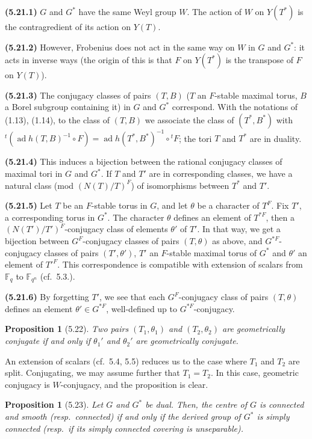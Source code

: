 \documentclass[11pt]{amsart}
\theoremstyle{plain}
\newtheorem{proposition}[theorem]{Proposition}
\theoremstyle{remark}
\DeclareMathOperator{\ad}{ad}
\begin{document}
\textbf{(5.21.1)} $G$ and $G^*$ have the same Weyl group $W$. The action of $W$ on $Y(T^*)$ is the contragredient of its action on $Y(T)$.

\textbf{(5.21.2)} However, Frobenius does not act in the same way on $W$ in $G$ and $G^*$: it acts in inverse ways (the origin of this is that $F$ on $Y(T^*)$ is the transpose of $F$ on $Y(T)$).

\textbf{(5.21.3)} The conjugacy classes of pairs $(T, B)$ ($T$ an $F$-stable maximal torus, $B$ a Borel subgroup containing it) in $G$ and $G^*$ correspond. With the notations of (1.13), (1.14), to the class of $(T, B)$ we associate the class of $(T^*, B^*)$ with ${}^t(\ad h(T, B)^{-1} \circ F) = \ad h(T^*, B^*)^{-1} \circ {}^tF$; the tori $T$ and $T^*$ are in duality.

\textbf{(5.21.4)} This induces a bijection between the rational conjugacy classes of maximal tori in $G$ and $G^*$. If $T$ and $T'$ are in corresponding classes, we have a natural class (mod $(N(T)/T)^F$) of isomorphisms between $T^*$ and $T'$.

\textbf{(5.21.5)} Let $T$ be an $F$-stable torus in $G$, and let $\theta$ be a character of $T^F$. Fix $T'$, a corresponding torus in $G^*$. The character $\theta$ defines an element of $T^{*F}$, then a $(N(T')/T')^F$-conjugacy class of elements $\theta'$ of $T'$. In that way, we get a bijection between $G^F$-conjugacy classes of pairs $(T, \theta)$ as above, and $G^{*F}$-conjugacy classes of pairs $(T', \theta')$, $T'$ an $F$-stable maximal torus of $G^*$ and $\theta'$ an element of $T'^F$. This correspondence is compatible with extension of scalars from $\mathbb{F}_q$ to $\mathbb{F}_{q^n}$ (cf.\ 5.3.).

\textbf{(5.21.6)} By forgetting $T'$, we see that each $G^F$-conjugacy class of pairs $(T, \theta)$ defines an element $\theta' \in G^{*F}$, well-defined up to $G^{*F}$-conjugacy.

\begin{proposition}[5.22]
Two pairs $(T_1, \theta_1)$ and $(T_2, \theta_2)$ are geometrically conjugate if and only if $\theta_1'$ and $\theta_2'$ are geometrically conjugate.
\end{proposition}

An extension of scalars (cf.\ 5.4, 5.5) reduces us to the case where $T_1$ and $T_2$ are split. Conjugating, we may assume further that $T_1 = T_2$. In this case, geometric conjugacy is $W$-conjugacy, and the proposition is clear.

\begin{proposition}[5.23]
Let $G$ and $G^*$ be dual. Then, the centre of $G$ is connected and smooth (resp.\ connected) if and only if the derived group of $G^*$ is simply connected (resp.\ if its simply connected covering is unseparable).
\end{proposition}
\end{document}
